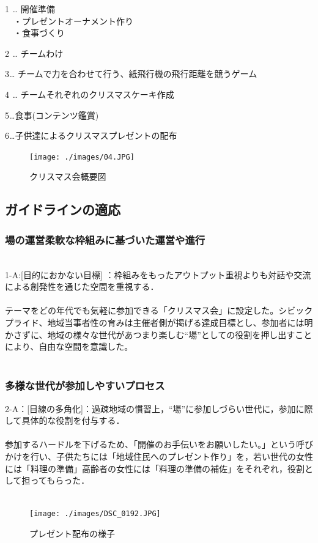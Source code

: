 \documentclass[a4paper]{jsarticle}
\begin{document}
\item 1 … 開催準備\\
　・プレゼントオーナメント作り\\
　・食事づくり
\item 2 … チームわけ
\item 3… チームで力を合わせて行う、紙飛行機の飛行距離を競うゲーム
\item 4 … チームそれぞれのクリスマスケーキ作成
\item 5…食事(コンテンツ鑑賞)
\item 6…子供達によるクリスマスプレゼントの配布\\

\begin{figure}[H]
  \begin{center}
    \texttt{[image: ./images/04.JPG]}
    \caption{クリスマス会概要図}
    \label{fig:tmu_hino}
  \end{center}
\end{figure}

\subsection{ガイドラインの適応}
\subsubsection{場の運営柔軟な枠組みに基づいた運営や進行}\\
1-A:[目的におかない目標] ：枠組みをもったアウトプット重視よりも対話や交流による創発性を通じた空間を重視する．\\\\
テーマをどの年代でも気軽に参加できる「クリスマス会」に設定した。シビックプライド、地域当事者性の育みは主催者側が掲げる達成目標とし、参加者には明かさずに、地域の様々な世代があつまり楽しむ“場”としての役割を押し出すことにより、自由な空間を意識した。\\\\

\subsubsection{多様な世代が参加しやすいプロセス}
2-A：[目線の多角化]：過疎地域の慣習上，“場”に参加しづらい世代に，参加に際して具体的な役割を付与する．\\\\
参加するハードルを下げるため、「開催のお手伝いをお願いしたい。」という呼びかけを行い、子供たちには「地域住民へのプレゼント作り」を，若い世代の女性には「料理の準備」高齢者の女性には「料理の準備の補佐」をそれぞれ，役割として担ってもらった．\\\\
\begin{figure}[H]
  \begin{center}
    \texttt{[image: ./images/DSC\_0192.JPG]}
    \caption{プレゼント配布の様子}
    \label{chirstmas2}
  \end{center}
\end{figure}
\end{document}
